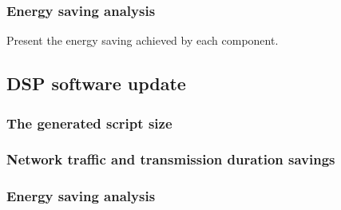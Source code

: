\subsubsection{Energy saving analysis}
Present the energy saving achieved by each component.



\subsection{DSP software update}
\subsubsection{The generated script size}
\subsubsection{Network traffic and transmission duration savings}
\subsubsection{Energy saving analysis}

